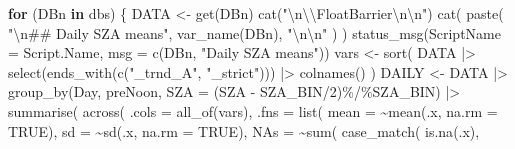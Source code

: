 \documentclass[
  10pt,
  a4paper,oneside]{article}
\newenvironment{Shaded}{\begin{snugshade}}{\end{snugshade}}
\newcommand{\AttributeTok}[1]{\textcolor[rgb]{0.77,0.63,0.00}{#1}}
\newcommand{\ConstantTok}[1]{\textcolor[rgb]{0.00,0.00,0.00}{#1}}
\newcommand{\ControlFlowTok}[1]{\textcolor[rgb]{0.13,0.29,0.53}{\textbf{#1}}}
\newcommand{\DecValTok}[1]{\textcolor[rgb]{0.00,0.00,0.81}{#1}}
\newcommand{\FunctionTok}[1]{\textcolor[rgb]{0.00,0.00,0.00}{#1}}
\newcommand{\NormalTok}[1]{#1}
\newcommand{\OtherTok}[1]{\textcolor[rgb]{0.56,0.35,0.01}{#1}}
\newcommand{\SpecialCharTok}[1]{\textcolor[rgb]{0.00,0.00,0.00}{#1}}
\newcommand{\StringTok}[1]{\textcolor[rgb]{0.31,0.60,0.02}{#1}}
\begin{document}
\begin{Shaded}
\begin{Highlighting}[]
\ControlFlowTok{for}\NormalTok{ (DBn }\ControlFlowTok{in}\NormalTok{ dbs) \{}
\NormalTok{    DATA }\OtherTok{\textless{}{-}} \FunctionTok{get}\NormalTok{(DBn)}
    \FunctionTok{cat}\NormalTok{(}\StringTok{"}\SpecialCharTok{\textbackslash{}n\textbackslash{}\textbackslash{}}\StringTok{FloatBarrier}\SpecialCharTok{\textbackslash{}n\textbackslash{}n}\StringTok{"}\NormalTok{)}
    \FunctionTok{cat}\NormalTok{(}
        \FunctionTok{paste}\NormalTok{(}
            \StringTok{"}\SpecialCharTok{\textbackslash{}n}\StringTok{\#\# Daily SZA means"}\NormalTok{, }\FunctionTok{var\_name}\NormalTok{(DBn),}
            \StringTok{"}\SpecialCharTok{\textbackslash{}n\textbackslash{}n}\StringTok{"}
\NormalTok{        )}
\NormalTok{    )}
    \FunctionTok{status\_msg}\NormalTok{(}\AttributeTok{ScriptName =}\NormalTok{ Script.Name, }\AttributeTok{msg =} \FunctionTok{c}\NormalTok{(DBn, }\StringTok{"Daily SZA means"}\NormalTok{))}
\NormalTok{    vars }\OtherTok{\textless{}{-}} \FunctionTok{sort}\NormalTok{(}
\NormalTok{        DATA }\SpecialCharTok{|\textgreater{}}
            \FunctionTok{select}\NormalTok{(}\FunctionTok{ends\_with}\NormalTok{(}\FunctionTok{c}\NormalTok{(}\StringTok{"\_trnd\_A"}\NormalTok{, }\StringTok{"\_strict"}\NormalTok{))) }\SpecialCharTok{|\textgreater{}}
            \FunctionTok{colnames}\NormalTok{()}
\NormalTok{    )}
\NormalTok{    DAILY }\OtherTok{\textless{}{-}}\NormalTok{ DATA }\SpecialCharTok{|\textgreater{}}
        \FunctionTok{group\_by}\NormalTok{(Day, preNoon, }\AttributeTok{SZA =}\NormalTok{ (SZA }\SpecialCharTok{{-}}\NormalTok{ SZA\_BIN}\SpecialCharTok{/}\DecValTok{2}\NormalTok{)}\SpecialCharTok{\%/\%}\NormalTok{SZA\_BIN) }\SpecialCharTok{|\textgreater{}}
        \FunctionTok{summarise}\NormalTok{(}
            \FunctionTok{across}\NormalTok{(}
                \AttributeTok{.cols =} \FunctionTok{all\_of}\NormalTok{(vars),}
                \AttributeTok{.fns =} \FunctionTok{list}\NormalTok{(}
                  \AttributeTok{mean =} \SpecialCharTok{\textasciitilde{}}\FunctionTok{mean}\NormalTok{(.x, }\AttributeTok{na.rm =} \ConstantTok{TRUE}\NormalTok{),}
                  \AttributeTok{sd =} \SpecialCharTok{\textasciitilde{}}\FunctionTok{sd}\NormalTok{(.x, }\AttributeTok{na.rm =} \ConstantTok{TRUE}\NormalTok{),}
                  \AttributeTok{NAs =} \SpecialCharTok{\textasciitilde{}}\FunctionTok{sum}\NormalTok{(}
                    \FunctionTok{case\_match}\NormalTok{(}
                      \FunctionTok{is.na}\NormalTok{(.x),}

\end{Highlighting}
\end{Shaded}
\end{document}
